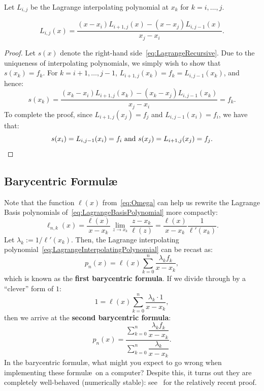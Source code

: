 Let $L_{i,j}$ be the Lagrange interpolating polynomial at $x_k$ for $k=i,\ldots,j$.

\begin{theorem}
\begin{equation}\label{eq:LagrangeRecursive}
L_{i,j}(x) = \dfrac{(x-x_i)L_{i+1,j}(x)-(x-x_j)L_{i,j-1}(x)}{x_j-x_i}.
\end{equation}
\end{theorem}
\begin{proof}
Let $s(x)$ denote the right-hand side~\eqref{eq:LagrangeRecursive}. Due to the uniqueness of interpolating polynomials, we simply wish to show that $s(x_k) = f_k$. For $k=i+1,\ldots,j-1$, $L_{i+1,j}(x_k) = f_k = L_{i,j-1}(x_k)$, and hence:
\[
s(x_k) = \dfrac{(x_k-x_i)L_{i+1,j}(x_k)-(x_k-x_j)L_{i,j-1}(x_k)}{x_j-x_i} = f_k.
\]
To complete the proof, since $L_{i+1,j}(x_j) = f_j$ and $L_{i,j-1}(x_i) = f_i$, we have that:
\[
s(x_i) = L_{i,j-1}(x_i) = f_i \hbox{ and } s(x_j) = L_{i+1,j}(x_j) = f_j.
\]
\end{proof}

\subsection{Barycentric Formul\ae}

Note that the function $\ell(x)$ from~\eqref{eq:Omega} can help us rewrite the Lagrange Basis polynomials of~\eqref{eq:LagrangeBasisPolynomial} more compactly:
\begin{equation}
\ell_{n,k}(x) = \dfrac{\ell(x)}{x-x_k}\lim_{z\to x_k}\dfrac{z-x_k}{\ell(z)} = \dfrac{\ell(x)}{x-x_k}\dfrac{1}{\ell'(x_k)}.
\end{equation}
Let $\lambda_k := 1/\ell'(x_k)$. Then, the Lagrange interpolating polynomial~\eqref{eq:LagrangeInterpolatingPolynomial} can be recast as:
\begin{equation}\label{eq:Barycentric1}
p_n(x) = \ell(x)\sum_{k=0}^n \dfrac{\lambda_kf_k}{x-x_k},
\end{equation}
which is known as the {\bf first barycentric formula}. If we divide through by a ``clever'' form of $1$:
\begin{equation}
1 = \ell(x)\sum_{k=0}^n \dfrac{\lambda_k\cdot 1}{x-x_k},
\end{equation}
then we arrive at the {\bf second barycentric formula}:
\begin{equation}\label{eq:Barycentric2}
p_n(x) = \dfrac{\displaystyle\sum_{k=0}^n \dfrac{\lambda_kf_k}{x-x_k}}{\displaystyle\sum_{k=0}^n \dfrac{\lambda_k}{x-x_k}}.
\end{equation}
In the barycentric formul\ae, what might you expect to go wrong when implementing these formul\ae~on a computer? Despite this, it turns out they are completely well-behaved (numerically stable): see~\cite{Higham-24-547-04} for the relatively recent proof.

